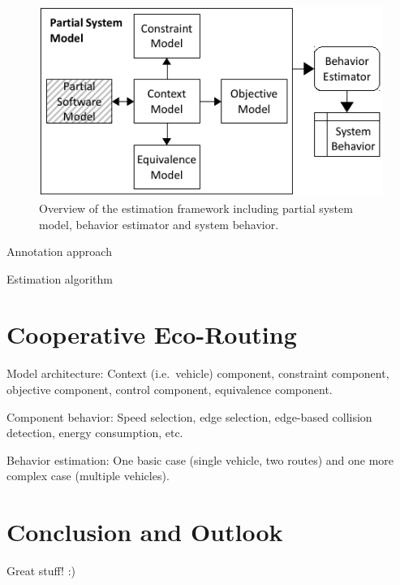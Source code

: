 \documentclass[conference]{../cls/IEEEtran}
\begin{document}
\begin{figure}[b]
	\centering
	\includegraphics{../gfx/framework.pdf}
	\caption{Overview of the estimation framework including partial system model, behavior estimator and system behavior.}
\end{figure}

Annotation approach \cite{Hackenberg2012}

Estimation algorithm

\section{Cooperative Eco-Routing}

Model architecture: Context (i.e.\ vehicle) component, constraint component, objective component, control component, equivalence component.

Component behavior: Speed selection, edge selection, edge-based collision detection, energy consumption, etc.

Behavior estimation: One basic case (single vehicle, two routes) and one more complex case (multiple vehicles).

\section{Conclusion and Outlook}

Great stuff! :)



\end{document}
